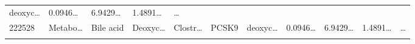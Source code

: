 \documentclass[
]{article}
\begin{document}
\begin{longtable}[]{@{}lllllllllll@{}}
\begin{minipage}[t]{0.09\columnwidth}
deoxyc\ldots{}\strut
\end{minipage} & \begin{minipage}[t]{0.07\columnwidth}\raggedright
0.0946\ldots{}\strut
\end{minipage} & \begin{minipage}[t]{0.07\columnwidth}\raggedright
6.9429\ldots{}\strut
\end{minipage} & \begin{minipage}[t]{0.07\columnwidth}\raggedright
1.4891\ldots{}\strut
\end{minipage} & \begin{minipage}[t]{0.03\columnwidth}\raggedright
\ldots{}\strut
\end{minipage}\tabularnewline
\begin{minipage}[t]{0.05\columnwidth}\raggedright
222528\strut
\end{minipage} & \begin{minipage}[t]{0.07\columnwidth}\raggedright
Metabo\ldots{}\strut
\end{minipage} & \begin{minipage}[t]{0.07\columnwidth}\raggedright
Bile acid\strut
\end{minipage} & \begin{minipage}[t]{0.09\columnwidth}\raggedright
Deoxyc\ldots{}\strut
\end{minipage} & \begin{minipage}[t]{0.07\columnwidth}\raggedright
Clostr\ldots{}\strut
\end{minipage} & \begin{minipage}[t]{0.07\columnwidth}\raggedright
PCSK9\strut
\end{minipage} & \begin{minipage}[t]{0.09\columnwidth}\raggedright
deoxyc\ldots{}\strut
\end{minipage} & \begin{minipage}[t]{0.07\columnwidth}\raggedright
0.0946\ldots{}\strut
\end{minipage} & \begin{minipage}[t]{0.07\columnwidth}\raggedright
6.9429\ldots{}\strut
\end{minipage} & \begin{minipage}[t]{0.07\columnwidth}\raggedright
1.4891\ldots{}\strut
\end{minipage} & \begin{minipage}[t]{0.03\columnwidth}\raggedright
\ldots{}\strut
\end{minipage}\tabularnewline
\begin{minipage}[t]{0.05\columnwidth}\raggedright

\end{minipage}
\end{longtable}
\end{document}
